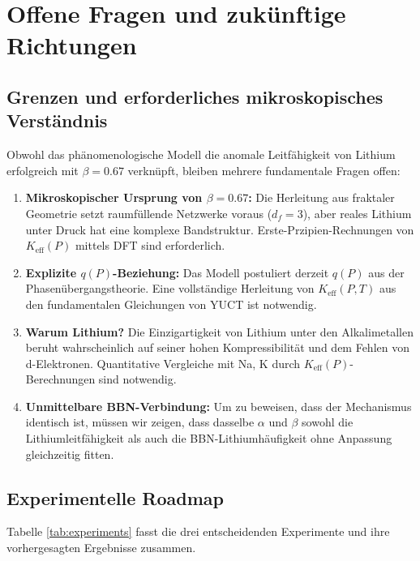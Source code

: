 \documentclass[12pt,a4paper]{article}
\theoremstyle{remark}
\newcommand{\Ke}{K_{\mathrm{eff}}}
\newcommand{\df}{d_{\!f}}
\newcommand{\alp}{\alpha}
\begin{document}
	\section{Offene Fragen und zukünftige Richtungen}
	\label{sec:open-questions}
	
	\subsection{Grenzen und erforderliches mikroskopisches Verständnis}
	
	Obwohl das phänomenologische Modell die anomale Leitfähigkeit von Lithium erfolgreich mit \(\beta = 0.67\) verknüpft, bleiben mehrere fundamentale Fragen offen:
	
	\begin{enumerate}
		\item \textbf{Mikroskopischer Ursprung von \(\beta = 0.67\):} Die Herleitung aus fraktaler Geometrie setzt raumfüllende Netzwerke voraus (\(\df = 3\)), aber reales Lithium unter Druck hat eine komplexe Bandstruktur. Erste-Przipien-Rechnungen von \(\Ke(P)\) mittels DFT sind erforderlich.
		
		\item \textbf{Explizite \(q(P)\)-Beziehung:} Das Modell postuliert derzeit \(q(P)\) aus der Phasenübergangstheorie. Eine vollständige Herleitung von \(\Ke(P,T)\) aus den fundamentalen Gleichungen von YUCT ist notwendig.
		
		\item \textbf{Warum Lithium?} Die Einzigartigkeit von Lithium unter den Alkalimetallen beruht wahrscheinlich auf seiner hohen Kompressibilität und dem Fehlen von d-Elektronen. Quantitative Vergleiche mit Na, K durch \(\Ke(P)\)-Berechnungen sind notwendig.
		
		\item \textbf{Unmittelbare BBN-Verbindung:} Um zu beweisen, dass der Mechanismus identisch ist, müssen wir zeigen, dass dasselbe \(\alp\) und \(\beta\) sowohl die Lithiumleitfähigkeit als auch die BBN-Lithiumhäufigkeit ohne Anpassung gleichzeitig fitten.
	\end{enumerate}
	
	\subsection{Experimentelle Roadmap}
	
	Tabelle \ref{tab:experiments} fasst die drei entscheidenden Experimente und ihre vorhergesagten Ergebnisse zusammen.
	
\end{document}
